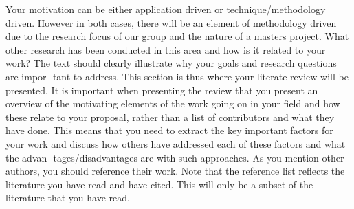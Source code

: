 Your motivation can be either application driven or technique/methodology driven.
However in both cases, there will be an element of methodology driven due to 
the research focus of our group and the nature of a masters project. What other
research has been conducted in this area and how is it related to your work? The
text should clearly illustrate why your goals and research questions are impor-
tant to address. This section is thus where your literate review will be presented.
It is important when presenting the review that you present an overview of the
motivating elements of the work going on in your field and how these relate to
your proposal, rather than a list of contributors and what they have done. This
means that you need to extract the key important factors for your work and
discuss how others have addressed each of these factors and what the advan-
tages/disadvantages are with such approaches. As you mention other authors,
you should reference their work. Note that the reference list reflects the literature
you have read and have cited. This will only be a subset of the literature that
you have read.
\fi